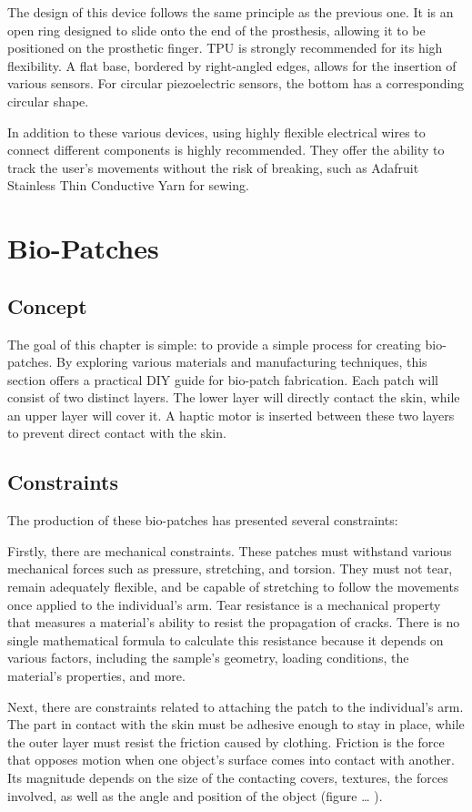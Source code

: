 The design of this device follows the same principle as the previous one. It is an open ring designed to slide onto the end of the prosthesis, allowing it to be positioned on the prosthetic finger. TPU is strongly recommended for its high flexibility. A flat base, bordered by right-angled edges, allows for the insertion of various sensors. For circular piezoelectric sensors, the bottom has a corresponding circular shape.

In addition to these various devices, using highly flexible electrical wires to connect different components is highly recommended. They offer the ability to track the user's movements without the risk of breaking, such as Adafruit Stainless Thin Conductive Yarn for sewing.


\section{Bio-Patches}
\subsection{Concept}
The goal of this chapter is simple: to provide a simple process for creating bio-patches. By exploring various materials and manufacturing techniques, this section offers a practical DIY guide for bio-patch fabrication. Each patch will consist of two distinct layers. The lower layer will directly contact the skin, while an upper layer will cover it. A haptic motor is inserted between these two layers to prevent direct contact with the skin. 

\subsection{Constraints}
The production of these bio-patches has presented several constraints:

Firstly, there are mechanical constraints. These patches must withstand various mechanical forces such as pressure, stretching, and torsion. They must not tear, remain adequately flexible, and be capable of stretching to follow the movements once applied to the individual's arm. Tear resistance is a mechanical property that measures a material's ability to resist the propagation of cracks. There is no single mathematical formula to calculate this resistance because it depends on various factors, including the sample's geometry, loading conditions, the material's properties, and more.

Next, there are constraints related to attaching the patch to the individual's arm. The part in contact with the skin must be adhesive enough to stay in place, while the outer layer must resist the friction caused by clothing. Friction is the force that opposes motion when one object's surface comes into contact with another. Its magnitude depends on the size of the contacting covers, textures, the forces involved, as well as the angle and position of the object (figure … ).

